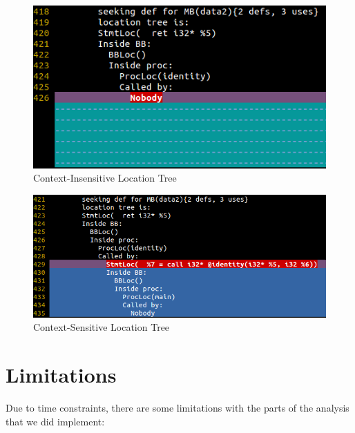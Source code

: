 \begin{figure}
\begin{center}
\leavevmode
\includegraphics[scale=0.5]{images/calling_ci.png}
\end{center}
\caption{Context-Insensitive Location Tree}
\label{fig:calling-ci}
\end{figure}

\begin{figure}
\begin{center}
\leavevmode
\includegraphics[scale=0.5]{images/calling_cs.png}
\end{center}
\caption{Context-Sensitive Location Tree}
\label{fig:calling-cs}
\end{figure}


\section{Limitations}

Due to time constraints, there are some limitations with the parts of the
analysis that we did implement:

